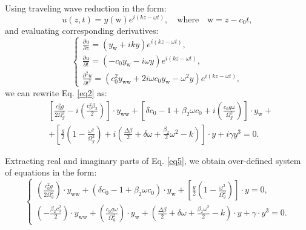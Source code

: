 \documentclass{article}
\begin{document}
Using traveling wave reduction in the form:
\begin{equation} \label{eq3}
    u\left(z, t\right) = y(\mathrm{w}) e^{i\left(k z-\omega t\right)}, \quad \text{where} \quad \mathrm{w} = z - c_{0} t,
\end{equation}
and evaluating corresponding derivatives:
\begin{equation} \label{eq4}
    \begin{cases}
        \displaystyle
        \frac{\partial u}{\partial z} = \left(y_{\mathrm{w}} + i k y\right) e^{i\left(k z-\omega t\right)},\\
        \displaystyle
        \frac{\partial u}{\partial t} = \left(-c_{0} y_{\mathrm{w}} - i \omega y\right) e^{i\left(k z-\omega t\right)}, \\
        \displaystyle
        \frac{\partial^2 u}{\partial t^2} = \left(c^{2}_{0}y_{\mathrm{ww}} + 2 i\omega c_{0} y_{\mathrm{w}} - \omega^{2}y\right) e^{i\left(k z-\omega t\right)},
    \end{cases}
\end{equation}
we can rewrite Eq. \ref{eq2} as:
\begin{equation} \label{eq5}
    \begin{split}
        &\left[\frac{c^{2}_{0} g}{2 \Omega^2_{g}} -i \left(\frac{c^2_{0}\beta_{2}} {2}\right)\right] \cdot y_{\mathrm{ww}} +
        \left[\delta c_{0} - 1 + \beta_{2} \omega c_{0} + i \left(\frac{c_{0} g \omega}{\Omega^2_{g}}\right)\right] \cdot y_{\mathrm{w}} +\\
        & + \left[\frac{g}{2}\left(1-\frac{\omega^{2}}{\Omega^2_{g}}\right) + i \left(\frac{\Delta \beta}{2}+\delta \omega + \frac{\beta_{2}}{2} \omega^{2} -k\right)\right]\cdot y +
        i \gamma y^{3} = 0.
    \end{split}
\end{equation}

Extracting real and imaginary parts of  Eq. \ref{eq5}, we obtain over-defined system of equations in the form:
\begin{equation} \label{eq6}
    \begin{cases}
        \displaystyle \left(\frac{c^{2}_{0} g}{2 \Omega^2_{g}}\right) \cdot y_{\mathrm{ww}} + \left(\delta c_{0} - 1 + \beta_{2} \omega c_{0}\right) \cdot y_{\mathrm{w}} + \left[\frac{g}{2}\left(1-\frac{\omega^{2}}{\Omega^2_{g}}\right)\right] \cdot y = 0,\\
        \displaystyle \left(-\frac{\beta_{2} c^{2}_{0}}{2}\right) \cdot y_{\mathrm{ww}} + \left(\frac{c_{0} g \omega}{\Omega^2_{g}}\right) \cdot y_{\mathrm{w}} + \left(\frac{\Delta \beta}{2} + \delta \omega + \frac{\beta_{2} \omega^{2}}{2} - k\right) \cdot y + \gamma \cdot y^3 = 0.
    \end{cases}
\end{equation}
\end{document}
